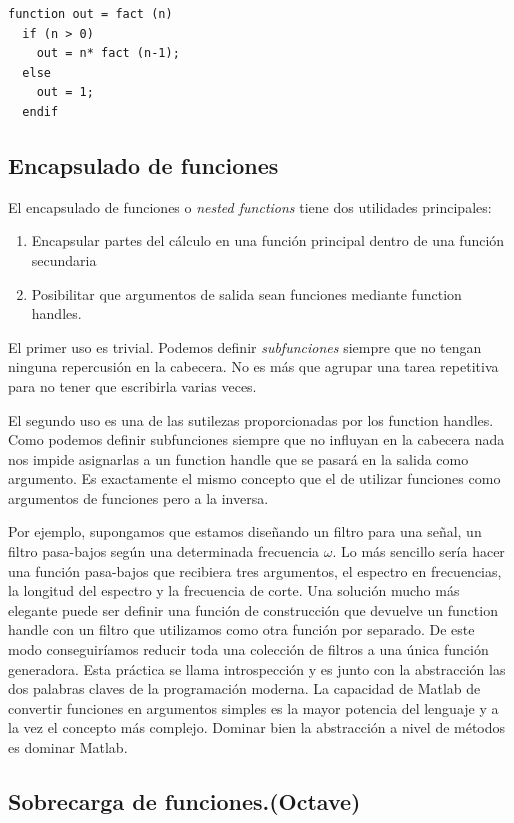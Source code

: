\begin{lstlisting}
function out = fact (n)
  if (n > 0)
    out = n* fact (n-1);
  else
    out = 1;
  endif
\end{lstlisting}

\subsection{Encapsulado de funciones}

El encapsulado de funciones o \emph{nested functions} tiene dos
utilidades principales:

\begin{enumerate}
\item Encapsular partes del cálculo en una función principal dentro de
  una función secundaria
\item Posibilitar que argumentos de salida sean funciones mediante
  function handles.
\end{enumerate}
El primer uso es trivial. Podemos definir \emph{subfunciones} siempre
que no tengan ninguna repercusión en la cabecera. No es más que
agrupar una tarea repetitiva para no tener que escribirla varias
veces.

El segundo uso es una de las sutilezas proporcionadas por los function
handles. Como podemos definir subfunciones siempre que no influyan en
la cabecera nada nos impide asignarlas a un function handle que se
pasará en la salida como argumento. Es exactamente el mismo concepto
que el de utilizar funciones como argumentos de funciones pero a la
inversa.

Por ejemplo, supongamos que estamos diseñando un filtro para una
señal, un filtro pasa-bajos según una determinada frecuencia $\omega$.
Lo más sencillo sería hacer una función pasa-bajos que recibiera tres
argumentos, el espectro en frecuencias, la longitud del espectro y la
frecuencia de corte. Una solución mucho más elegante puede ser definir
una función de construcción que devuelve un function handle con un
filtro que utilizamos como otra función por separado. De este modo
conseguiríamos reducir toda una colección de filtros a una única
función generadora. Esta práctica se llama introspección y es junto
con la abstracción las dos palabras claves de la programación moderna.
La capacidad de Matlab de convertir funciones en argumentos simples es
la mayor potencia del lenguaje y a la vez el concepto más complejo.
Dominar bien la abstracción a nivel de métodos es dominar Matlab.


\subsection{Sobrecarga de funciones.(Octave)}

